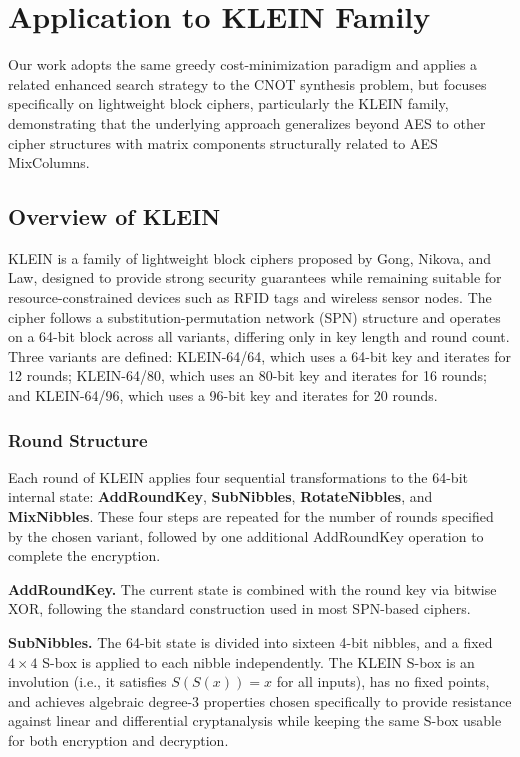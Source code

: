 \chapter{Application to KLEIN Family}
\label{ch:klein}

Our work adopts the same greedy cost-minimization paradigm and applies a related enhanced search strategy to the CNOT synthesis problem, but focuses specifically on lightweight block ciphers, particularly the KLEIN family\cite{cryptoeprint:2026/1007}, demonstrating that the underlying approach generalizes beyond AES to other cipher structures with matrix components structurally related to AES MixColumns.

\section{Overview of KLEIN}
\label{sec:klein-overview}
KLEIN is a family of lightweight block ciphers proposed by Gong, Nikova, and Law\cite{gong2011klein}, designed to provide strong security guarantees while remaining suitable for resource-constrained devices such as RFID tags and wireless sensor nodes. The cipher follows a substitution-permutation network (SPN) structure and operates on a 64-bit block across all variants, differing only in key length and round count. Three variants are defined: KLEIN-64/64, which uses a 64-bit key and iterates for 12 rounds; KLEIN-64/80, which uses an 80-bit key and iterates for 16 rounds; and KLEIN-64/96, which uses a 96-bit key and iterates for 20 rounds.

\subsection{Round Structure}
\label{subsec:klein-round-structure}
Each round of KLEIN applies four sequential transformations to the 64-bit internal state: \textbf{AddRoundKey}, \textbf{SubNibbles}, \textbf{RotateNibbles}, and \textbf{MixNibbles}. These four steps are repeated for the number of rounds specified by the chosen variant, followed by one additional AddRoundKey operation to complete the encryption.

\textbf{AddRoundKey.} The current state is combined with the round key via bitwise XOR, following the standard construction used in most SPN-based ciphers.

\textbf{SubNibbles.} The 64-bit state is divided into sixteen 4-bit nibbles, and a fixed $4\times4$ S-box is applied to each nibble independently. The KLEIN S-box is an involution (i.e., it satisfies $S(S(x)) = x$ for all inputs), has no fixed points, and achieves algebraic degree-3 properties chosen specifically to provide resistance against linear and differential cryptanalysis while keeping the same S-box usable for both encryption and decryption.

